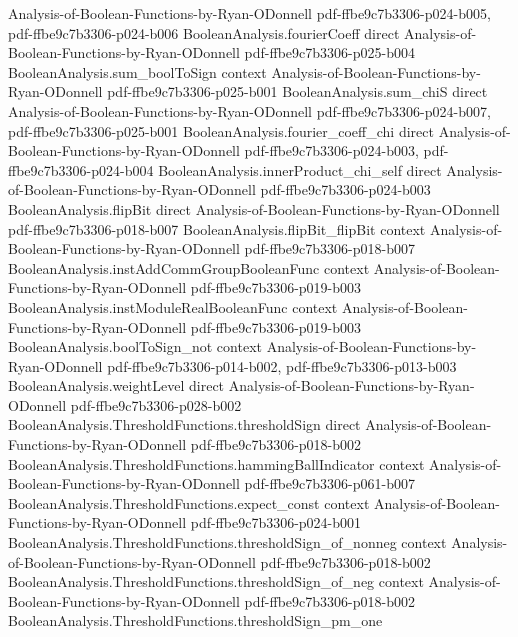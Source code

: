 \begin{theorem}
  {Analysis-of-Boolean-Functions-by-Ryan-ODonnell}
  {pdf-ffbe9c7b3306-p024-b005,
    pdf-ffbe9c7b3306-p024-b006}
\proofstep
  {BooleanAnalysis.fourierCoeff}
  {direct}
  {Analysis-of-Boolean-Functions-by-Ryan-ODonnell}
  {pdf-ffbe9c7b3306-p025-b004}
\proofstep
  {BooleanAnalysis.sum_boolToSign}
  {context}
  {Analysis-of-Boolean-Functions-by-Ryan-ODonnell}
  {pdf-ffbe9c7b3306-p025-b001}
\proofstep
  {BooleanAnalysis.sum_chiS}
  {direct}
  {Analysis-of-Boolean-Functions-by-Ryan-ODonnell}
  {pdf-ffbe9c7b3306-p024-b007,
    pdf-ffbe9c7b3306-p025-b001}
\proofstep
  {BooleanAnalysis.fourier_coeff_chi}
  {direct}
  {Analysis-of-Boolean-Functions-by-Ryan-ODonnell}
  {pdf-ffbe9c7b3306-p024-b003,
    pdf-ffbe9c7b3306-p024-b004}
\proofstep
  {BooleanAnalysis.innerProduct_chi_self}
  {direct}
  {Analysis-of-Boolean-Functions-by-Ryan-ODonnell}
  {pdf-ffbe9c7b3306-p024-b003}
\proofstep
  {BooleanAnalysis.flipBit}
  {direct}
  {Analysis-of-Boolean-Functions-by-Ryan-ODonnell}
  {pdf-ffbe9c7b3306-p018-b007}
\proofstep
  {BooleanAnalysis.flipBit_flipBit}
  {context}
  {Analysis-of-Boolean-Functions-by-Ryan-ODonnell}
  {pdf-ffbe9c7b3306-p018-b007}
\proofstep
  {BooleanAnalysis.instAddCommGroupBooleanFunc}
  {context}
  {Analysis-of-Boolean-Functions-by-Ryan-ODonnell}
  {pdf-ffbe9c7b3306-p019-b003}
\proofstep
  {BooleanAnalysis.instModuleRealBooleanFunc}
  {context}
  {Analysis-of-Boolean-Functions-by-Ryan-ODonnell}
  {pdf-ffbe9c7b3306-p019-b003}
\proofstep
  {BooleanAnalysis.boolToSign_not}
  {context}
  {Analysis-of-Boolean-Functions-by-Ryan-ODonnell}
  {pdf-ffbe9c7b3306-p014-b002,
    pdf-ffbe9c7b3306-p013-b003}
\proofstep
  {BooleanAnalysis.weightLevel}
  {direct}
  {Analysis-of-Boolean-Functions-by-Ryan-ODonnell}
  {pdf-ffbe9c7b3306-p028-b002}
\proofstep
  {BooleanAnalysis.ThresholdFunctions.thresholdSign}
  {direct}
  {Analysis-of-Boolean-Functions-by-Ryan-ODonnell}
  {pdf-ffbe9c7b3306-p018-b002}
\proofstep
  {BooleanAnalysis.ThresholdFunctions.hammingBallIndicator}
  {context}
  {Analysis-of-Boolean-Functions-by-Ryan-ODonnell}
  {pdf-ffbe9c7b3306-p061-b007}
\proofstep
  {BooleanAnalysis.ThresholdFunctions.expect_const}
  {context}
  {Analysis-of-Boolean-Functions-by-Ryan-ODonnell}
  {pdf-ffbe9c7b3306-p024-b001}
\proofstep
  {BooleanAnalysis.ThresholdFunctions.thresholdSign_of_nonneg}
  {context}
  {Analysis-of-Boolean-Functions-by-Ryan-ODonnell}
  {pdf-ffbe9c7b3306-p018-b002}
\proofstep
  {BooleanAnalysis.ThresholdFunctions.thresholdSign_of_neg}
  {context}
  {Analysis-of-Boolean-Functions-by-Ryan-ODonnell}
  {pdf-ffbe9c7b3306-p018-b002}
\proofstep
  {BooleanAnalysis.ThresholdFunctions.thresholdSign_pm_one}

\end{theorem}
